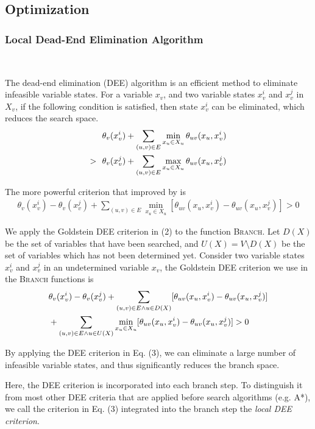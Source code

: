 \subsection{Optimization}

\subsubsection{Local Dead-End Elimination Algorithm}\ 

The dead-end elimination (DEE) algorithm is an efficient method to eliminate infeasible variable states. For a variable $x_v$, and two variable states $x_v^i$ and $x_v^j$ in $X_v$, if the following condition is satisfied, then state $x_v^i$ can be eliminated, which reduces the search space.
\begin{align}
& \theta_v(x_v^i)+\sum_{(u,v)\in E}\min_{x_u\in X_u}\theta_{uv}(x_u,x_v^i) \notag \\
>\ \ & \theta_v(x_v^j)+\sum_{(u,v)\in E}\max_{x_u\in X_u}\theta_{uv}(x_u,x_v^j)
\end{align}

The more powerful criterion that improved by \cite{goldstein1994efficient} is
\begin{align}
\theta_v(x_v^i)-\theta_v(x_v^j)+\sum_{(u,v)\in E}\min_{x_u\in X_u}[\theta_{uv}(x_u,x_v^i)-\theta_{uv}(x_u,x_v^j)] > 0
\end{align}

We apply the Goldstein DEE criterion in (2) to the function \textsc{Branch}. Let $D(X)$ be the set of variables that have been searched, and $U(X)=V\setminus D(X)$ be the set of variables which has not been determined yet. Consider two variable states $x_v^i$ and $x_v^j$ in an undetermined variable $x_v$, the Goldstein DEE criterion we use in the \textsc{Branch} functions is
\begin{align}
& \theta_v(x_v^i)-\theta_v(x_v^j)+\sum_{(u,v)\in E\wedge u\in D(X)}[\theta_{uv}(x_u,x_v^i)-\theta_{uv}(x_u,x_v^j)] \notag \\
& +\sum_{(u,v)\in E\wedge u\in U(X)}\min_{x_u\in X_u}[\theta_{uv}(x_u,x_v^i)-\theta_{uv}(x_u,x_v^j)] > 0
\end{align}

By applying the DEE criterion in Eq. (3), we can eliminate a large number of infeasible variable states, and thus significantly reduces the branch space.

Here, the DEE criterion is incorporated into each branch step. To distinguish it from most other DEE criteria that are applied before search algorithms (e.g. A*\cite[]{gainza2013osprey}), we call the criterion in Eq. (3) integrated into the branch step the \textit{local DEE criterion}.

